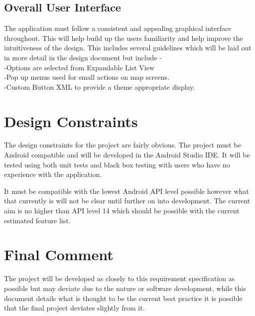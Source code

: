 \subsection{Overall User Interface}
The application must follow a consistent and appealing graphical interface throughout. This will help build up the users familiarity and help improve the intuitiveness of the design. This includes several guidelines which will be laid out in more detail in the design document but include -\\ 
	-Options are selected from Expandable List View\\
	-Pop up menus used for small actions on map screens.\\
	-Custom Button XML to provide a theme appropriate     display.
\section{Design Constraints}
The design constraints for the project are fairly obvious. The project must be Android compatible and will be developed in the Android Studio IDE. It will be tested using both unit tests and black box testing with users who have no experience with the application. 

It must be compatible with the lowest Android API\cite{api} level possible however what that currently is will not be clear until further on into development. The current aim is no higher than API level 14 which should be possible with the current estimated feature list.

\section{Final Comment}
The project will be developed as closely to this requirement specification as possible but may deviate due to the nature or software development, while this document details what is thought to be the current best practice it is possible that the final project deviates slightly from it. 
